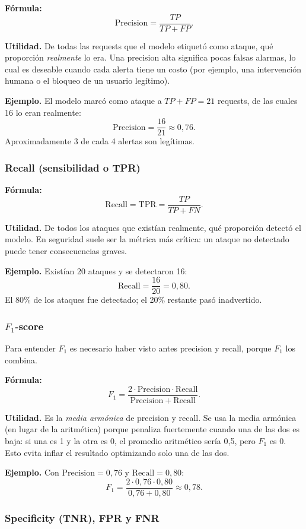 \documentclass[12pt,oneside]{report}
\begin{document}
\textbf{Fórmula:}
\[
\mathrm{Precision}=\frac{TP}{TP+FP}.
\]

\textbf{Utilidad.} De todas las requests que el modelo etiquetó como
ataque, qué proporción \emph{realmente} lo era. Una precision alta
significa pocas falsas alarmas, lo cual es deseable cuando cada alerta
tiene un costo (por ejemplo, una intervención humana o el bloqueo de un
usuario legítimo).

\textbf{Ejemplo.} El modelo marcó como ataque a $TP+FP=21$ requests, de
las cuales 16 lo eran realmente:
\[
\mathrm{Precision}=\frac{16}{21}\approx 0{,}76.
\]
Aproximadamente 3 de cada 4 alertas son legítimas.

\subsubsection{Recall (sensibilidad o TPR)}

\textbf{Fórmula:}
\[
\mathrm{Recall}=\mathrm{TPR}=\frac{TP}{TP+FN}.
\]

\textbf{Utilidad.} De todos los ataques que existían realmente, qué
proporción detectó el modelo. En seguridad suele ser la métrica más
crítica: un ataque no detectado puede tener consecuencias graves.

\textbf{Ejemplo.} Existían 20 ataques y se detectaron 16:
\[
\mathrm{Recall}=\frac{16}{20}=0{,}80.
\]
El 80\% de los ataques fue detectado; el 20\% restante pasó inadvertido.

\subsubsection{$F_1$-score}

Para entender $F_1$ es necesario haber visto antes precision y recall,
porque $F_1$ los combina.

\textbf{Fórmula:}
\[
F_1=\frac{2\cdot \mathrm{Precision}\cdot \mathrm{Recall}}{\mathrm{Precision}+\mathrm{Recall}}.
\]

\textbf{Utilidad.} Es la \emph{media armónica} de precision y recall. Se
usa la media armónica (en lugar de la aritmética) porque penaliza
fuertemente cuando una de las dos es baja: si una es 1 y la otra es 0,
el promedio aritmético sería 0{,}5, pero $F_1$ es 0. Esto evita inflar
el resultado optimizando solo una de las dos.

\textbf{Ejemplo.} Con $\mathrm{Precision}=0{,}76$ y $\mathrm{Recall}=0{,}80$:
\[
F_1=\frac{2\cdot 0{,}76\cdot 0{,}80}{0{,}76+0{,}80}\approx 0{,}78.
\]

\subsubsection{Specificity (TNR), FPR y FNR}
\end{document}
